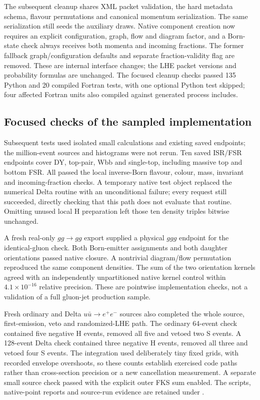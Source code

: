 The subsequent cleanup shares XML packet validation, the hard metadata
schema, flavour permutations and canonical momentum serialization.
The same serialization still seeds the auxiliary draws. Native component
creation now requires an explicit configuration, graph, flow and diagram
factor, and a Born-state check always receives both momenta and incoming
fractions. The former fallback graph/configuration defaults and separate
fraction-validity flag are removed. These are internal interface changes;
the LHE packet versions and probability formulas are unchanged. The
focused cleanup checks passed 135 Python and 20 compiled Fortran tests,
with one optional Python test skipped; four affected Fortran units also
compiled against generated process includes.

\subsection{Focused checks of the sampled implementation}
\label{sec:impl-sampled-checks}

Subsequent tests used isolated small calculations and existing saved
endpoints; the million-event sources and histograms were not rerun.
Ten saved ISR/FSR endpoints cover DY, top-pair, Wbb and single-top,
including massive top and bottom FSR. All passed the local inverse-Born
flavour, colour, mass, invariant and incoming-fraction checks. A temporary
native test object replaced the numerical Delta routine with an
unconditional failure; every request still succeeded, directly checking
that this path does not evaluate that routine. Omitting unused local H
preparation left those ten density triples bitwise unchanged.

A fresh real-only $gg\to gg$ export supplied a physical $ggg$ endpoint
for the identical-gluon check. Both Born-emitter assignments and both
daughter orientations passed native closure. A nontrivial diagram/flow
permutation reproduced the same component densities. The sum of the two
orientation kernels agreed with an independently unpartitioned native
kernel control within $4.1\times10^{-16}$ relative precision. These are
pointwise implementation checks, not a validation of a full gluon-jet
production sample.

Fresh ordinary and Delta $u\bar u\to e^+e^-$ sources also completed the
whole source, first-emission, veto and randomized-LHE path. The ordinary
64-event check contained five negative H events, removed all five and
vetoed two S events. A 128-event Delta check contained three negative H
events, removed all three and vetoed four S events. The integration used
deliberately tiny fixed grids, with recorded envelope overshoots, so
these counts establish exercised code paths rather than cross-section
precision or a new cancellation measurement. A separate small source
check passed with the explicit outer FKS sum enabled. The scripts,
native-point reports and source-run evidence are retained under
.
